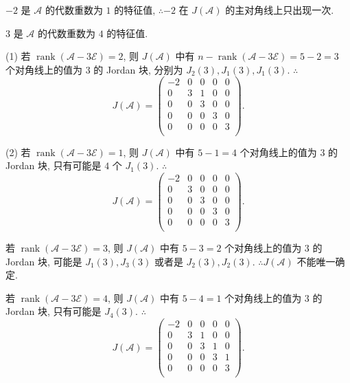 \documentclass{ctexart}
\begin{document}
\begin{solution}
    $-2$ 是 $\mathcal{A}$ 的代数重数为 $1$ 的特征值, $\therefore-2$ 在 $J(\mathcal{A})$ 的主对角线上只出现一次.

    $3$ 是 $\mathcal{A}$ 的代数重数为 $4$ 的特征值.

    (1) 若 $\operatorname{rank}(\mathcal{A}-3\mathcal{E})=2$, 则 $J(\mathcal{A})$ 中有 $n-\operatorname{rank}(\mathcal{A}-3\mathcal{E})=5-2=3$ 个对角线上的值为 $3$ 的 Jordan 块, 分别为 $J_2(3),J_1(3),J_1(3)$. $\therefore$
    \[J(\mathcal{A})=\begin{pmatrix}
        -2 & 0 & 0 & 0 & 0 \\
        0 & 3 & 1 & 0 & 0 \\
        0 & 0 & 3 & 0 & 0 \\
        0 & 0 & 0 & 3 & 0 \\
        0 & 0 & 0 & 0 & 3 \\
    \end{pmatrix}.\]

    (2) 若 $\operatorname{rank}(\mathcal{A}-3\mathcal{E})=1$, 则 $J(\mathcal{A})$ 中有 $5-1=4$ 个对角线上的值为 $3$ 的 Jordan 块, 只有可能是 $4$ 个 $J_1(3)$. $\therefore$
    \[J(\mathcal{A})=\begin{pmatrix}
        -2 & 0 & 0 & 0 & 0 \\
        0 & 3 & 0 & 0 & 0 \\
        0 & 0 & 3 & 0 & 0 \\
        0 & 0 & 0 & 3 & 0 \\
        0 & 0 & 0 & 0 & 3 \\
    \end{pmatrix}.\]

    若 $\operatorname{rank}(\mathcal{A}-3\mathcal{E})=3$, 则 $J(\mathcal{A})$ 中有 $5-3=2$ 个对角线上的值为 $3$ 的 Jordan 块, 可能是 $J_1(3),J_3(3)$ 或者是 $J_2(3),J_2(3)$. $\therefore J(\mathcal{A})$ 不能唯一确定.

    若 $\operatorname{rank}(\mathcal{A}-3\mathcal{E})=4$, 则 $J(\mathcal{A})$ 中有 $5-4=1$ 个对角线上的值为 $3$ 的 Jordan 块, 只有可能是 $J_4(3)$. $\therefore$
    \[J(\mathcal{A})=\begin{pmatrix}
        -2 & 0 & 0 & 0 & 0 \\
        0 & 3 & 1 & 0 & 0 \\
        0 & 0 & 3 & 1 & 0 \\
        0 & 0 & 0 & 3 & 1 \\
        0 & 0 & 0 & 0 & 3 \\
    \end{pmatrix}.\]
\end{solution}
\end{document}
